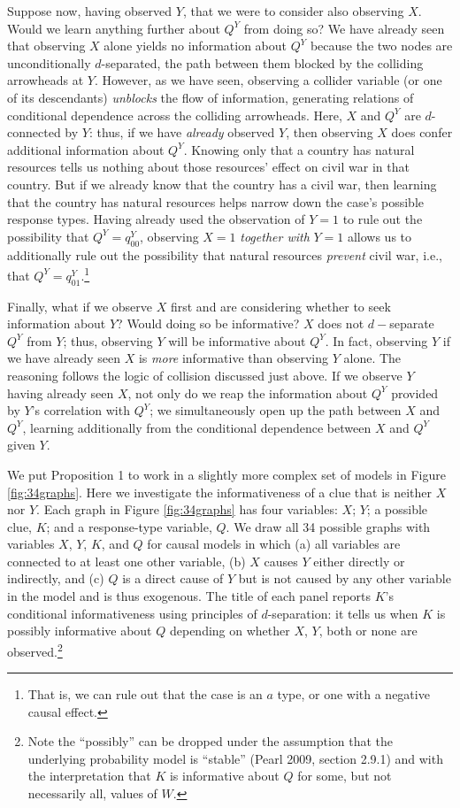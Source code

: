 \documentclass[12pt,]{book}
\let\rmarkdownfootnote\footnote%
\def\footnote{\protect\rmarkdownfootnote}
\begin{document}
Suppose now, having observed \(Y\), that we were to consider also observing \(X\). Would we learn anything further about \(Q^Y\) from doing so? We have already seen that observing \(X\) alone yields no information about \(Q^Y\) because the two nodes are unconditionally \(d\)-separated, the path between them blocked by the colliding arrowheads at \(Y\). However, as we have seen, observing a collider variable (or one of its descendants) \emph{unblocks} the flow of information, generating relations of conditional dependence across the colliding arrowheads. Here, \(X\) and \(Q^Y\) are \(d\)-connected by \(Y\): thus, if we have \emph{already} observed \(Y\), then observing \(X\) does confer additional information about \(Q^Y\). Knowing only that a country has natural resources tells us nothing about those resources' effect on civil war in that country. But if we already know that the country has a civil war, then learning that the country has natural resources helps narrow down the case's possible response types. Having already used the observation of \(Y=1\) to rule out the possibility that \(Q^Y=q^Y_{00}\), observing \(X=1\) \emph{together with} \(Y=1\) allows us to additionally rule out the possibility that natural resources \emph{prevent} civil war, i.e., that \(Q^Y=q^Y_{01}\).\footnote{That is, we can rule out that the case is an \(a\) type, or one with a negative causal effect.}

Finally, what if we observe \(X\) first and are considering whether to seek information about \(Y\)? Would doing so be informative? \(X\) does not \(d-\)separate \(Q^Y\) from \(Y\); thus, observing \(Y\) will be informative about \(Q^Y\). In fact, observing \(Y\) if we have already seen \(X\) is \emph{more} informative than observing \(Y\) alone. The reasoning follows the logic of collision discussed just above. If we observe \(Y\) having already seen \(X\), not only do we reap the information about \(Q^Y\) provided by \(Y\)'s correlation with \(Q^Y\); we simultaneously open up the path between \(X\) and \(Q^Y\), learning additionally from the conditional dependence between \(X\) and \(Q^Y\) given \(Y\).

We put Proposition 1 to work in a slightly more complex set of models in Figure \ref{fig:34graphs}. Here we investigate the informativeness of a clue that is neither \(X\) nor \(Y\). Each graph in Figure \ref{fig:34graphs} has four variables: \(X\); \(Y\); a possible clue, \(K\); and a response-type variable, \(Q\). We draw all 34 possible graphs with variables \(X\), \(Y\), \(K\), and \(Q\) for causal models in which (a) all variables are connected to at least one other variable, (b) \(X\) causes \(Y\) either directly or indirectly, and (c) \(Q\) is a direct cause of \(Y\) but is not caused by any other variable in the model and is thus exogenous. The title of each panel reports \(K\)'s conditional informativeness using principles of \(d\)-separation: it tells us when \(K\) is possibly informative about \(Q\) depending on whether \(X\), \(Y\), both or none are observed.\footnote{Note the ``possibly'' can be dropped under the assumption that the underlying probability model is ``stable'' (Pearl 2009, section 2.9.1) and with the interpretation that \(K\) is informative about \(Q\) for some, but not necessarily all, values of \(W\).}
\end{document}
